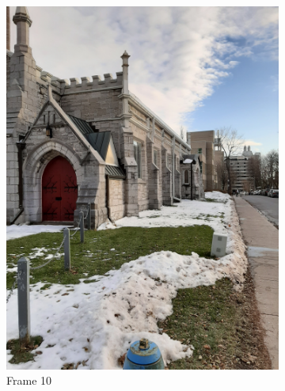 \documentclass[conference]{IEEEtran}
\begin{document}
\begin{figure}[!h]
\begin{subfigure}[b]{0.2\linewidth}
    \includegraphics[width=\linewidth, angle = -90]{images/frame10.jpg}
    \caption{Frame 10}
  \end{subfigure}
  \begin{subfigure}[b]{0.2\linewidth}

\end{subfigure}
\end{figure}
\end{document}
